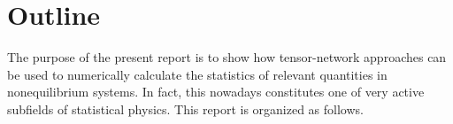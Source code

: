 \section{Outline}

\par The purpose of the present report is to show how tensor-network approaches can be used to numerically calculate the statistics of relevant quantities in nonequilibrium systems. In fact, this nowadays constitutes one of very active subfields of statistical physics. This report is organized as follows.







